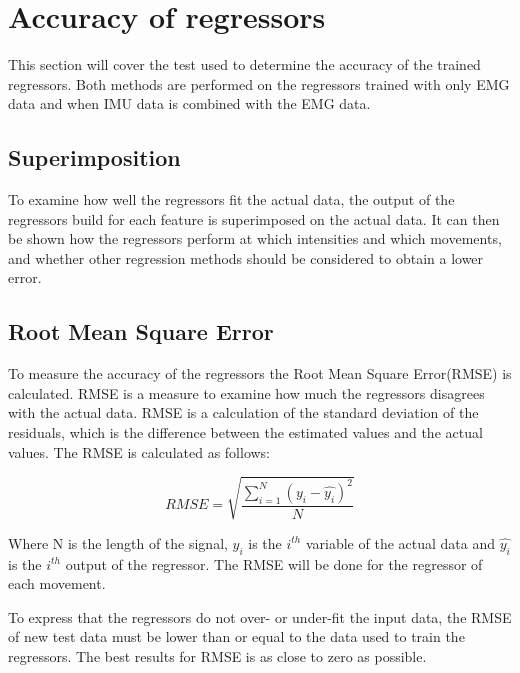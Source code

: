 \section{Accuracy of regressors}

This section will cover the test used to determine the accuracy of the trained regressors. Both methods are performed on the regressors trained with only EMG data and when IMU data is combined with the EMG data. 

\subsection{Superimposition}
To examine how well the regressors fit the actual data, the output of the regressors build for each feature is superimposed on the actual data. It can then be shown how the regressors perform at which intensities and which movements, and whether other regression methods should be considered to obtain a lower error.  


\subsection{Root Mean Square Error}
To measure the accuracy of the regressors the Root Mean Square Error(RMSE) is calculated. RMSE is a measure to examine how much the regressors disagrees with the actual data. RMSE is a calculation of the standard deviation of the residuals, which is the difference between the estimated values and the actual values. The RMSE is calculated as follows:

\begin{equation}
RMSE = \sqrt{\frac{\sum\limits_{i=1}^N(y_i - \hat{y_i})^2}{N}}
\end{equation}

Where N is the length of the signal, $y_i$ is the $i^{th}$ variable of the actual data and $\hat{y_i}$ is the $i^{th}$ output of the regressor. The RMSE will be done for the regressor of each movement.

To express that the regressors do not over- or under-fit the input data, the RMSE of new test data must be lower than or equal to the data used to train the regressors. The best results for RMSE is as close to zero as possible. 


